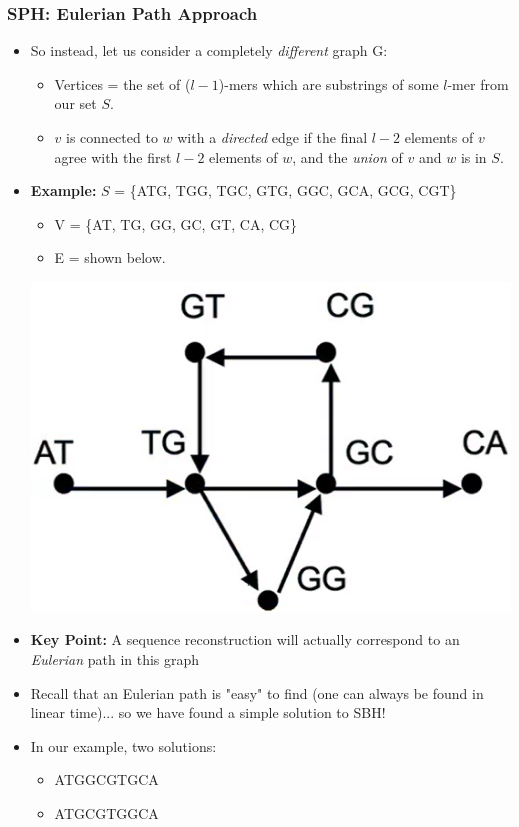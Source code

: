 \documentclass[10pt]{article}
\begin{document}
\subsubsection*{SPH: Eulerian Path Approach}
\begin{itemize}
    \item So instead, let us consider a completely \textit{different} graph G:
    \begin{itemize}
        \item Vertices = the set of ($l - 1$)-mers which are substrings of some $l$-mer from our set $S$.
        \item $v$ is connected to $w$ with a \textit{directed} edge if the final $l - 2$ elements of $v$ agree with the first $l - 2$ elements of $w$, and the \textit{union} of $v$ and $w$ is in $S$.
    \end{itemize}
    \item \textbf{Example:} $S$ = \{ATG, TGG, TGC, GTG, GGC, GCA, GCG, CGT\}
    \begin{itemize}
        \item V = \{AT, TG, GG, GC, GT, CA, CG\}
        \item E = shown below.
    \end{itemize}
    \begin{center}
        \includegraphics*[scale=0.8]{W4_12.png}
    \end{center}
    \item \textbf{Key Point:} A sequence reconstruction will actually correspond to an \textit{Eulerian} path in this graph
    \item Recall that an Eulerian path is "easy" to find (one can always be found in linear time)... so we have found a simple solution to SBH!
    \item In our example, two solutions: 
    \begin{itemize}
        \item ATGGCGTGCA
        \item ATGCGTGGCA
    \end{itemize}
\end{itemize}
\end{document}
